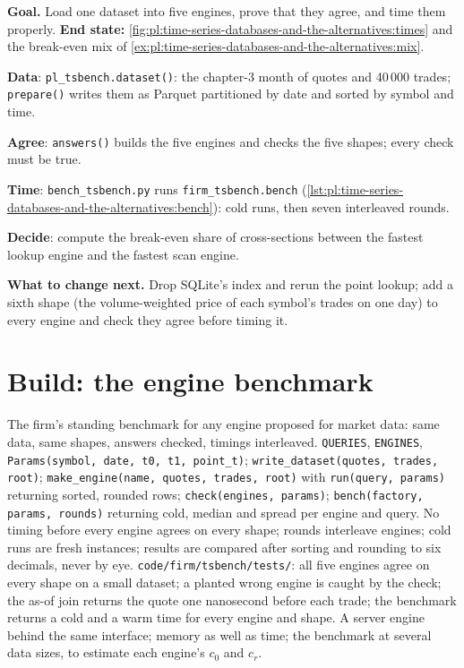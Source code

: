 \begin{tutorial}
\textbf{Goal.} Load one dataset into five engines, prove that they agree, and time them properly. \textbf{End state:}
\cref{fig:pl:time-series-databases-and-the-alternatives:times} and the break-even mix of
\cref{ex:pl:time-series-databases-and-the-alternatives:mix}.
\begin{tutsteps}
\item \textbf{Data}: \texttt{pl\_tsbench.dataset()}: the chapter-3 month of quotes and 40\,000 trades; \texttt{prepare()} writes
them as Parquet partitioned by date and sorted by symbol and time.
\item \textbf{Agree}: \texttt{answers()} builds the five engines and checks the five shapes; every check must be true.
\item \textbf{Time}: \texttt{bench\_tsbench.py} runs \texttt{firm\_tsbench.bench}
(\cref{lst:pl:time-series-databases-and-the-alternatives:bench}): cold runs, then seven interleaved rounds.
\item \textbf{Decide}: compute the break-even share of cross-sections between the fastest lookup engine and the fastest scan
engine.
\end{tutsteps}
\textbf{What to change next.} Drop SQLite's index and rerun the point lookup; add a sixth shape (the volume-weighted price of
each symbol's trades on one day) to every engine and check they agree before timing it.
\end{tutorial}

\section{Build: the engine benchmark}\label{bld:pl:time-series-databases-and-the-alternatives:tsbench}

\begin{build}
 The firm's standing benchmark for any engine proposed for market data: same data, same shapes, answers checked,
timings interleaved.
 \texttt{QUERIES}, \texttt{ENGINES}, \texttt{Params(symbol, date, t0, t1, point\_t)};
\texttt{write\_dataset(quotes, trades, root)}; \texttt{make\_engine(name, quotes, trades, root)} with \texttt{run(query, params)}
returning sorted, rounded rows; \texttt{check(engines, params)}; \texttt{bench(factory, params, rounds)} returning cold, median
and spread per engine and query.
 No timing before every engine agrees on every shape; rounds interleave engines; cold runs are fresh instances;
results are compared after sorting and rounding to six decimals, never by eye.
 \texttt{code/firm/tsbench/tests/}: all five engines agree on every shape on a small dataset; a planted
wrong engine is caught by the check; the as-of join returns the quote one nanosecond before each trade; the benchmark returns a
cold and a warm time for every engine and shape.
 A server engine behind the same interface; memory as well as time; the benchmark at several data sizes, to
estimate each engine's $c_0$ and $c_r$.
\end{build}

